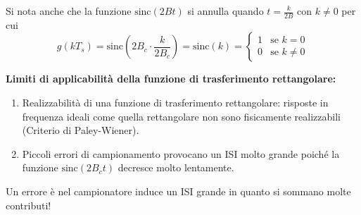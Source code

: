 \begin{enumerate}
\begin{center}
          \end{center}

          Si nota anche che la funzione $\text{sinc}(2Bt)$ si annulla quando $t = \frac{k}{2B}$ con $k \neq 0$ per cui
          \[
              g(kT_s) = \text{sinc} \left(2B_c\cdot\frac{k}{2B_c}\right) = \text{sinc}(k) = 
              \begin{cases}
                  1 & \text{se } k=0    \\
                  0 & \text{se } k\neq0
              \end{cases}
          \]
\end{enumerate}


\textbf{Limiti di applicabilità della funzione di trasferimento rettangolare:}

\begin{enumerate}
    \item Realizzabilità di una funzione di trasferimento rettangolare: risposte in frequenza ideali come quella rettangolare non sono fisicamente realizzabili (Criterio di Paley-Wiener).
    \item Piccoli errori di campionamento provocano un ISI molto grande poiché la funzione $\text{sinc}(2B_ct)$ decresce molto lentamente.
\end{enumerate}

Un errore è nel campionatore induce un ISI grande in quanto si sommano molte contributi!




